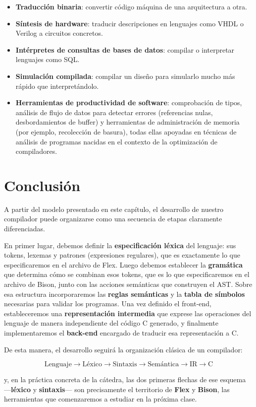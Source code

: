 \documentclass[11pt,a4paper]{article}
\begin{document}
\begin{itemize}
    \item \textbf{Traducción binaria}: convertir código máquina de una arquitectura a otra.
    \item \textbf{Síntesis de hardware}: traducir descripciones en lenguajes como VHDL o Verilog
    a circuitos concretos.
    \item \textbf{Intérpretes de consultas de bases de datos}: compilar o interpretar lenguajes
    como SQL.
    \item \textbf{Simulación compilada}: compilar un diseño para simularlo mucho más rápido que
    interpretándolo.
    \item \textbf{Herramientas de productividad de software}: comprobación de tipos, análisis de
    flujo de datos para detectar errores (referencias nulas, desbordamientos de buffer) y
    herramientas de administración de memoria (por ejemplo, recolección de basura), todas ellas
    apoyadas en técnicas de análisis de programas nacidas en el contexto de la optimización de
    compiladores.
\end{itemize}

\section{Conclusión}

A partir del modelo presentado en este capítulo, el desarrollo de nuestro compilador puede
organizarse como una secuencia de etapas claramente diferenciadas.

En primer lugar, debemos definir la \textbf{especificación léxica} del lenguaje: sus tokens,
lexemas y patrones (expresiones regulares), que es exactamente lo que especificaremos en el
archivo de Flex. Luego debemos establecer la \textbf{gramática} que determina cómo se combinan
esos tokens, que es lo que especificaremos en el archivo de Bison, junto con las acciones
semánticas que construyen el AST. Sobre esa estructura incorporaremos las \textbf{reglas
semánticas} y la \textbf{tabla de símbolos} necesarias para validar los programas. Una vez
definido el front-end, estableceremos una \textbf{representación intermedia} que exprese las
operaciones del lenguaje de manera independiente del código C generado, y finalmente
implementaremos el \textbf{back-end} encargado de traducir esa representación a C.

De esta manera, el desarrollo seguirá la organización clásica de un compilador:

\[
\boxed{
\text{Lenguaje}
\rightarrow
\text{Léxico}
\rightarrow
\text{Sintaxis}
\rightarrow
\text{Semántica}
\rightarrow
\text{IR}
\rightarrow
\text{C}
}
\]

y, en la práctica concreta de la cátedra, las dos primeras flechas de ese esquema
—\textbf{léxico} y \textbf{sintaxis}— son precisamente el territorio de \textbf{Flex} y
\textbf{Bison}, las herramientas que comenzaremos a estudiar en la próxima clase.
\end{document}
